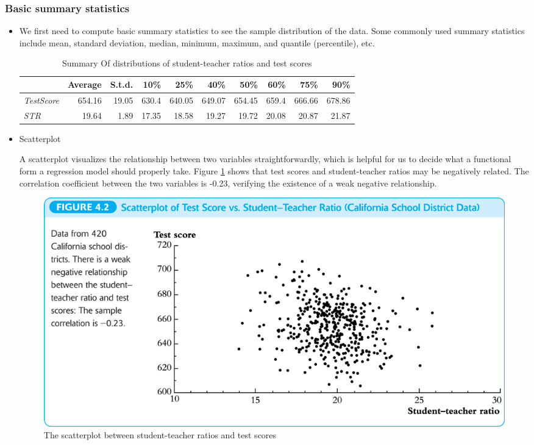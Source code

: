 \documentclass[11pt]{article}
\begin{document}
\subsubsection*{Basic summary statistics}
\label{sec:org9b0221c}

\begin{itemize}
\item We first need to compute basic summary statistics to see the sample
distribution of the data. Some commonly used summary statistics
include mean, standard deviation, median, minimum, maximum, and
quantile (percentile), etc. 

\begin{table}[htbp]
\caption{\label{tab:org24a7091}
Summary Of distributions of student-teacher ratios and test scores}
\centering
\begin{tabular}{lrrrrrrrrr}
\toprule
 & Average & S.t.d. & 10\% & 25\% & 40\% & 50\% & 60\% & 75\% & 90\%\\
\midrule
\emph{TestScore} & 654.16 & 19.05 & 630.4 & 640.05 & 649.07 & 654.45 & 659.4 & 666.66 & 678.86\\
\emph{STR} & 19.64 & 1.89 & 17.35 & 18.58 & 19.27 & 19.72 & 20.08 & 20.87 & 21.87\\
\bottomrule
\end{tabular}
\end{table}
\end{itemize}

\begin{itemize}
\item Scatterplot
\label{sec:org2be3722}

A scatterplot visualizes the relationship between two variables
straightforwardly, which is helpful for us to decide what a functional
form a regression model should properly take. Figure \ref{fig:orgaf87f21}
shows that test scores and student-teacher ratios may be negatively
related. The correlation coefficient between the two variables is
-0.23, verifying the existence of a weak negative relationship.

\begin{figure}[htbp]
\centering
\includegraphics[width=1.0\textwidth]{figure/fig-4-2.png}
\caption{\label{fig:orgaf87f21}
The scatterplot between student-teacher ratios and test scores}
\end{figure}
\end{itemize}
\end{document}
